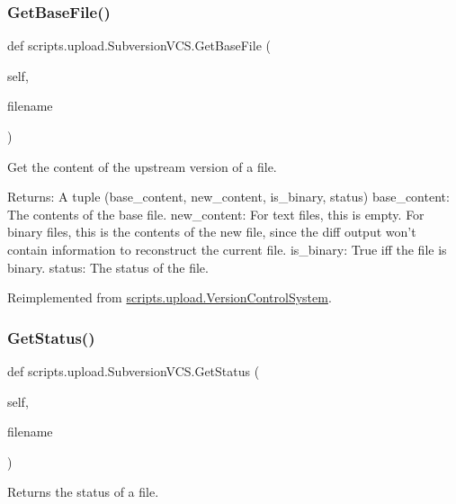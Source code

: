 \subsubsection{\texorpdfstring{GetBaseFile()}{GetBaseFile()}}
{\footnotesize\ttfamily def scripts.\+upload.\+Subversion\+V\+C\+S.\+Get\+Base\+File (\begin{DoxyParamCaption}\item[{}]{self,  }\item[{}]{filename }\end{DoxyParamCaption})}

\begin{DoxyVerb}Get the content of the upstream version of a file.

Returns:
  A tuple (base_content, new_content, is_binary, status)
base_content: The contents of the base file.
new_content: For text files, this is empty.  For binary files, this is
  the contents of the new file, since the diff output won't contain
  information to reconstruct the current file.
is_binary: True iff the file is binary.
status: The status of the file.
\end{DoxyVerb}
 

Reimplemented from \mbox{\hyperlink{classscripts_1_1upload_1_1_version_control_system_ae50b1c259d0f1e12e855a142c8ee04e4}{scripts.\+upload.\+Version\+Control\+System}}.

\mbox{\label{classscripts_1_1upload_1_1_subversion_v_c_s_a9c261fc41639e3db5a9c8a0d422adf1e}} 
\subsubsection{\texorpdfstring{GetStatus()}{GetStatus()}}
{\footnotesize\ttfamily def scripts.\+upload.\+Subversion\+V\+C\+S.\+Get\+Status (\begin{DoxyParamCaption}\item[{}]{self,  }\item[{}]{filename }\end{DoxyParamCaption})}

\begin{DoxyVerb}Returns the status of a file.\end{DoxyVerb}
 \mbox{\label{classscripts_1_1upload_1_1_subversion_v_c_s_a30d4e7ce889cdfba5af7f43a7fac47f9}} 
